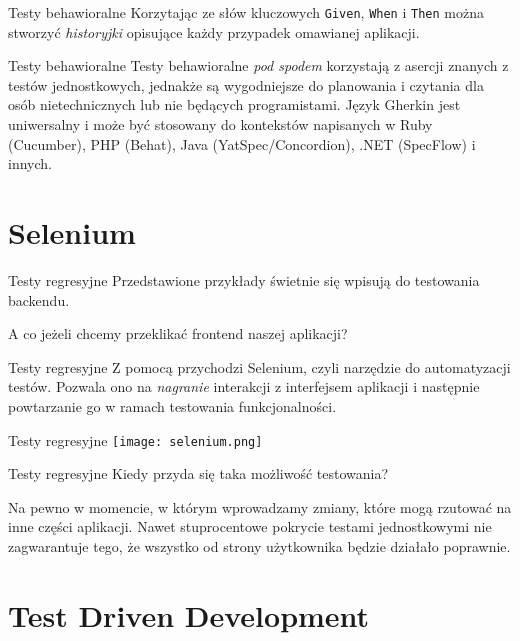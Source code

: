 \begin{frame}{Testy behawioralne}
	Korzytając ze słów kluczowych \texttt{Given}, \texttt{When} i \texttt{Then} można stworzyć \emph{historyjki} opisujące każdy przypadek omawianej aplikacji.
\end{frame}

\begin{frame}{Testy behawioralne}
	Testy behawioralne \emph{pod spodem} korzystają z asercji znanych z testów jednostkowych, jednakże są wygodniejsze do planowania i czytania dla osób nietechnicznych lub nie będących programistami. Język Gherkin jest uniwersalny i może być stosowany do kontekstów napisanych w Ruby (Cucumber), PHP (Behat), Java (YatSpec/Concordion), .NET (SpecFlow) i innych.
\end{frame}

\section{Selenium}

\begin{frame}{Testy regresyjne}
	Przedstawione przykłady świetnie się wpisują do testowania backendu.
	
	A co jeżeli chcemy przeklikać frontend naszej aplikacji?
\end{frame}

\begin{frame}{Testy regresyjne}
	Z pomocą przychodzi Selenium, czyli narzędzie do automatyzacji testów. Pozwala ono na \emph{nagranie} interakcji z interfejsem aplikacji i następnie powtarzanie go w ramach testowania funkcjonalności.
\end{frame}

\begin{frame}{Testy regresyjne}
	\centering
	\texttt{[image: selenium.png]}
\end{frame}

\begin{frame}{Testy regresyjne}
	Kiedy przyda się taka możliwość testowania?
	
	Na pewno w momencie, w którym wprowadzamy zmiany, które mogą rzutować na inne części aplikacji. Nawet stuprocentowe pokrycie testami jednostkowymi nie zagwarantuje tego, że wszystko od strony użytkownika będzie działało poprawnie.
\end{frame}

\section{Test Driven Development}

